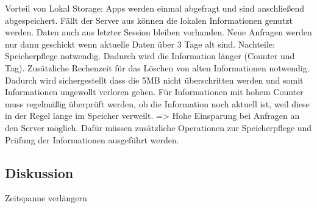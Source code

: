 Vorteil von Lokal Storage: Apps werden einmal abgefragt und sind anschließend abgespeichert. Fällt der Server aus können die lokalen Informationen genutzt werden. Daten auch aus letzter Session bleiben vorhanden. Neue Anfragen werden nur dann geschickt wenn aktuelle Daten über 3 Tage alt sind.
Nachteile: Speicherpflege notwendig. Dadurch wird die Information länger (Counter und Tag). Zusätzliche Rechenzeit für das Löschen von alten Informationen notwendig. Dadurch wird sichergestellt dass die 5MB nicht überschritten werden und somit Informationen ungewollt verloren gehen. Für Informationen mit hohem Counter muss regelmäßig überprüft werden, ob die Information noch aktuell ist, weil diese in der Regel lange im Speicher verweilt.
=> Hohe Einsparung bei Anfragen an den Server möglich. Dafür müssen zusätzliche Operationen zur Speicherpflege und Prüfung der Informationen ausgeführt werden.


\subsection{Diskussion}
\label{ss:diskussionht2}

Zeitspanne verlängern